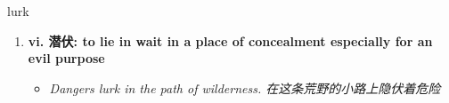
\begin{frame}
{\huge lurk}
\begin{center}
\begin{enumerate}\Large
  \item \textbf{vi. 潜伏: to lie in wait in a place of concealment especially for an evil purpose}
  \begin{itemize}
    \item \em{\Large{Dangers lurk in the path of wilderness. 在这条荒野的小路上隐伏着危险}}
  \end{itemize}
\end{enumerate}
\end{center}
\end{frame}
